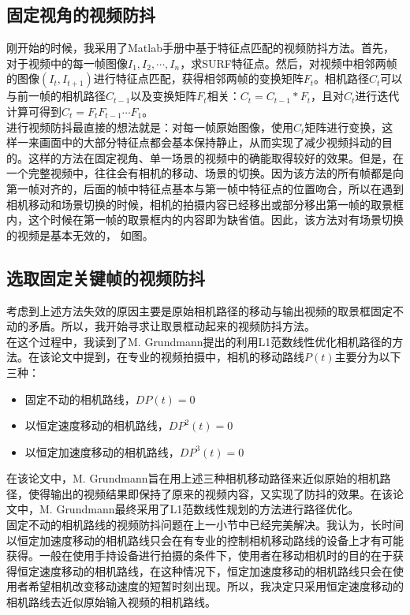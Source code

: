\documentclass[journal, a4paper]{IEEEtran}
\begin{document}
\subsection{固定视角的视频防抖}
    刚开始的时候，我采用了Matlab手册中基于特征点匹配的视频防抖方法\cite{Matlab}。首先，对于视频中的每一帧图像$I_{1}, I_{2}, \cdots, I_{n}$，求SURF特征点。然后，对视频中相邻两帧的图像$(I_{t}, I_{t+1})$进行特征点匹配，获得相邻两帧的变换矩阵$F_{t}$。相机路径$C_{t}$可以与前一帧的相机路径$C_{t-1}$以及变换矩阵$F_{t}$相关：$C_{t}=C_{t-1}*F_{t}$，且对$C_{t}$进行迭代计算可得到$C_{t}=F_{t}F_{t-1}\cdots F_{1}$。 \\
    
    进行视频防抖最直接的想法就是：对每一帧原始图像，使用$C_{t}$矩阵进行变换，这样一来画面中的大部分特征点都会基本保持静止，从而实现了减少视频抖动的目的。这样的方法在固定视角、单一场景的视频中的确能取得较好的效果。但是，在一个完整视频中，往往会有相机的移动、场景的切换。因为该方法的所有帧都是向第一帧对齐的，后面的帧中特征点基本与第一帧中特征点的位置吻合，所以在遇到相机移动和场景切换的时候，相机的拍摄内容已经移出或部分移出第一帧的取景框内，这个时候在第一帧的取景框内的内容即为缺省值。因此，该方法对有场景切换的视频是基本无效的， 如图。
    
\subsection{选取固定关键帧的视频防抖}
    考虑到上述方法失效的原因主要是原始相机路径的移动与输出视频的取景框固定不动的矛盾。所以，我开始寻求让取景框动起来的视频防抖方法。 \\
    
    在这个过程中，我读到了M. Grundmann提出的利用L1范数线性优化相机路径的方法\cite{L1Opt}。在该论文中提到，在专业的视频拍摄中，相机的移动路线$P(t)$主要分为以下三种：
    \begin{itemize}
    \item 固定不动的相机路线，$DP(t)=0$
    \item 以恒定速度移动的相机路线，$DP^2(t)=0$
    \item 以恒定加速度移动的相机路线，$DP^3(t)=0$
    \end{itemize}
    在该论文中，M. Grundmann旨在用上述三种相机移动路径来近似原始的相机路径，使得输出的视频结果即保持了原来的视频内容，又实现了防抖的效果。在该论文中，M. Grundmann最终采用了L1范数线性规划的方法进行路径优化。\\
    
    固定不动的相机路线的视频防抖问题在上一小节中已经完美解决。我认为，长时间以恒定加速度移动的相机路线只会在有专业的控制相机移动路线的设备上才有可能获得。一般在使用手持设备进行拍摄的条件下，使用者在移动相机时的目的在于获得恒定速度移动的相机路线，在这种情况下，恒定加速度移动的相机路线只会在使用者希望相机改变移动速度的短暂时刻出现。所以，我决定只采用恒定速度移动的相机路线去近似原始输入视频的相机路线。\\
    
\end{document}
